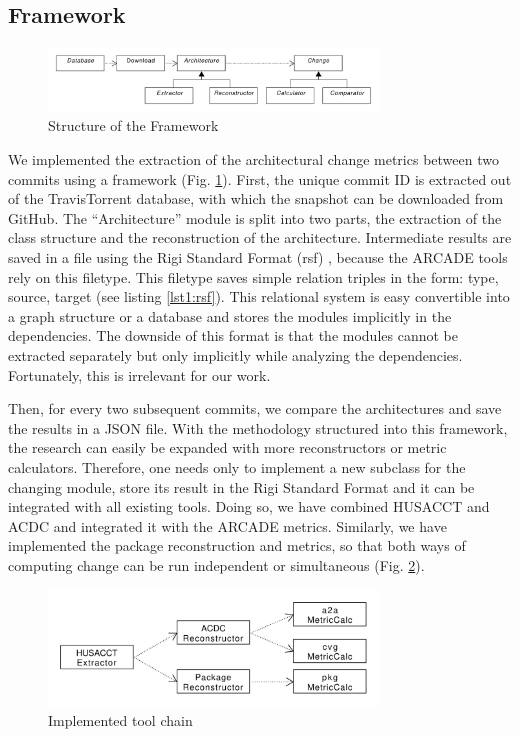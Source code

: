 \documentclass[conference]{IEEEtran}
\begin{document}
\subsection{Framework}

\begin{figure}[!t]
	\centering
	\includegraphics[width=3.45in]{assets/architecture.pdf}
	\caption{Structure of the Framework}
	\label{frameworkStructure}
\end{figure}

We implemented the extraction of the architectural change metrics between two commits using a framework (Fig. \ref{frameworkStructure}). First, the unique commit ID is extracted out of the TravisTorrent database, with which the snapshot can be downloaded from GitHub. 
The ``Architecture'' module is split into two parts, the extraction of the class structure and the reconstruction of the architecture. Intermediate results are saved in a file using the Rigi Standard Format (rsf) \cite{RSF}, because the ARCADE tools rely on this filetype. This filetype saves simple relation triples in the form: type, source, target (see listing \ref{lst1:rsf}). This relational system is easy convertible into a graph structure or a database and stores the modules implicitly in the dependencies. The downside of this format is that the modules cannot be extracted separately but only implicitly while analyzing the dependencies. Fortunately, this is irrelevant for our work.

Then, for every two subsequent commits, we compare the architectures and save the results in a JSON file. With the methodology structured into this framework, the research can easily be expanded with more reconstructors or metric calculators. Therefore, one needs only to implement a new subclass for the changing module, store its result in the Rigi Standard Format and it can be integrated with all existing tools. Doing so, we have combined HUSACCT and ACDC and integrated it with the ARCADE metrics. Similarly, we have implemented the package reconstruction and metrics, so that both ways of computing change can be run independent or simultaneous (Fig. \ref{implToolchain}).

\begin{figure}[!t]
	\centering
	\includegraphics[width=3.45in]{assets/implementedArc.pdf}
	\caption{Implemented tool chain}
	\label{implToolchain}
\end{figure}
\end{document}
